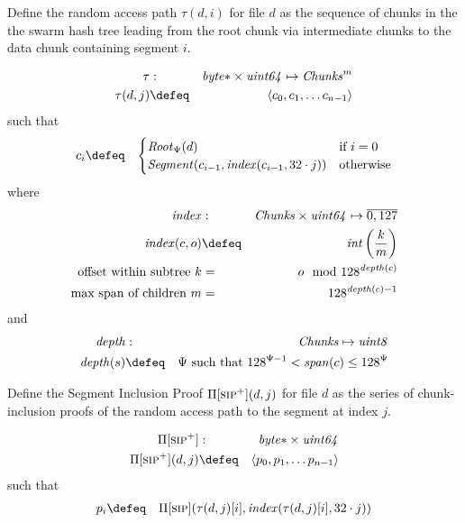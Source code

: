 \begin{definition}
\label{def:random-access-path}
Define the random access path $\tau(d,i)$ for file $d$ as the sequence of chunks in the the swarm hash tree leading from the root chunk via intermediate chunks to the data chunk containing segment $i$.

\begin{eqnarray}
\tau&:&\mathit{byte}{*}\times\mathit{uint64}\mapsto\mathit{Chunks}^m\\
\tau(d, j)&\defeq&\langle c_0, c_1, \ldots c_{n-1}\rangle
\end{eqnarray}
such that
\begin{eqnarray}
c_i&\defeq&
\begin{cases}
\mathit{Root}_\Psi(d)&\text{if }i=0\\
\mathit{Segment}(c_{i-1}, \mathit{index}(c_{i-1}, 32\cdot j))&\text{otherwise} 
\end{cases}
\end{eqnarray}
where
\begin{eqnarray}
\mathit{index}&:&\mathit{Chunks}\times\mathit{uint64}\mapsto\overline{0,127}\\
\mathit{index}(c, o)&\defeq&\mathit{int}\left(\frac{k}{m}\right)\\
\text{offset within subtree }k&=&o \mod 128^{\mathit{depth}(c)}\\
\text{max span of children } m&=&128^{\mathit{depth}(c)-1}
\end{eqnarray}
and
\begin{eqnarray}
\mathit{depth}&:&\mathit{Chunks}\mapsto \mathit{uint8}\\
\mathit{depth}(s)&\defeq&\Psi \text{ such that } 128^{\Psi-1}<\mathit{span}(c)\leq 128^\Psi
\end{eqnarray}
\end{definition}

\begin{definition}
\label{def:sip+}
Define the Segment Inclusion Proof $\Pi[\textsc{\lowercase{SIP}}^{+}](d, j)$ for file $d$ as the series of chunk-inclusion proofs of the random access path to the segment at index  $j$.

\begin{eqnarray}
\Pi[\textsc{\lowercase{SIP}}^{+}]&:&\mathit{byte}{*}\times\mathit{uint64}\\
\Pi[\textsc{\lowercase{SIP}}^{+}](d, j)&\defeq&\langle p_0, p_1, \ldots p_{n-1}\rangle
\end{eqnarray}
such that
\begin{eqnarray}
p_i&\defeq&
\Pi[\textsc{\lowercase{SIP}}](\tau(d,j)[i], \mathit{index}(\tau(d,j)[i],32\cdot j))
\end{eqnarray}
\end{definition}

